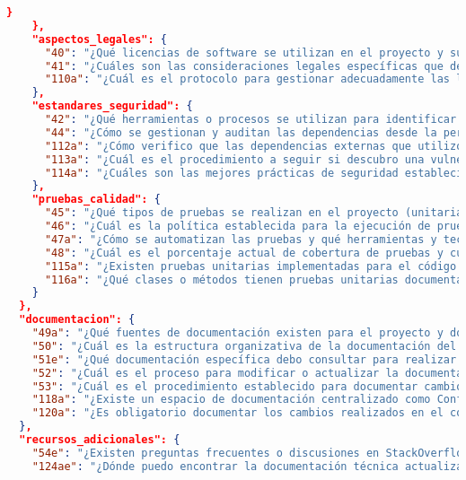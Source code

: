 \begin{lstlisting}[language=json, caption={Listado de elicitación de preguntas procesadas y clasificadas}, label={listado:preguntas}]
      }
    },
    "aspectos_legales": {
      "40": "¿Qué licencias de software se utilizan en el proyecto y sus dependencias?",
      "41": "¿Cuáles son las consideraciones legales específicas que deben tenerse en cuenta durante el desarrollo?",
      "110a": "¿Cuál es el protocolo para gestionar adecuadamente las licencias de componentes externos?"
    },
    "estandares_seguridad": {
      "42": "¿Qué herramientas o procesos se utilizan para identificar vulnerabilidades de seguridad en el código?",
      "44": "¿Cómo se gestionan y auditan las dependencias desde la perspectiva de seguridad?",
      "112a": "¿Cómo verifico que las dependencias externas que utilizo son seguras y se mantienen actualizadas?",
      "113a": "¿Cuál es el procedimiento a seguir si descubro una vulnerabilidad crítica en una dependencia?",
      "114a": "¿Cuáles son las mejores prácticas de seguridad establecidas que debo aplicar en mi código para este proyecto?"
    },
    "pruebas_calidad": {
      "45": "¿Qué tipos de pruebas se realizan en el proyecto (unitarias, funcionales, integración, rendimiento)?",
      "46": "¿Cuál es la política establecida para la ejecución de pruebas (por commit, por merge request, al final del sprint)?",
      "47a": "¿Cómo se automatizan las pruebas y qué herramientas y tecnologías se utilizan para ello?",
      "48": "¿Cuál es el porcentaje actual de cobertura de pruebas y cuál es el objetivo establecido?",
      "115a": "¿Existen pruebas unitarias implementadas para el código actual? ¿Dónde se encuentran?",
      "116a": "¿Qué clases o métodos tienen pruebas unitarias documentadas y cuáles necesitan implementación?"
    }
  },
  "documentacion": {
    "49a": "¿Qué fuentes de documentación existen para el proyecto y dónde puedo encontrarlas (API, guías, licencias, estándares)?",
    "50": "¿Cuál es la estructura organizativa de la documentación del proyecto?",
    "51e": "¿Qué documentación específica debo consultar para realizar esta tarea concreta?",
    "52": "¿Cuál es el proceso para modificar o actualizar la documentación del proyecto?",
    "53": "¿Cuál es el procedimiento establecido para documentar cambios en el código?",
    "118a": "¿Existe un espacio de documentación centralizado como Confluence para el proyecto?",
    "120a": "¿Es obligatorio documentar los cambios realizados en el código? ¿Qué nivel de detalle se requiere?"
  },
  "recursos_adicionales": {
    "54e": "¿Existen preguntas frecuentes o discusiones en StackOverflow relacionadas con este tema o tecnología?",
    "124ae": "¿Dónde puedo encontrar la documentación técnica actualizada para las tecnologías o herramientas específicas que necesito utilizar?",

\end{lstlisting}
